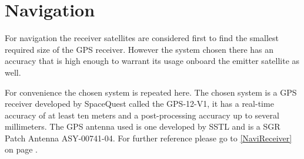 \section{Navigation}
\label{NaviEmitter}

For navigation the receiver satellites are considered first to find the smallest required size of the \acs{GPS} receiver. However the system chosen there has an accuracy that is high enough to warrant its usage onboard the emitter satellite as well.

For convenience the chosen system is repeated here. The chosen system is a \acs{GPS} receiver developed by SpaceQuest called the GPS-12-V1, it has a real-time accuracy of at least ten meters and a post-processing accuracy up to several millimeters. The \acs{GPS} antenna used is one developed by \ac{SSTL} and is a SGR Patch Antenna ASY-00741-04. For further reference please go to \ref{NaviReceiver} on page \pageref{NaviReceiver}.